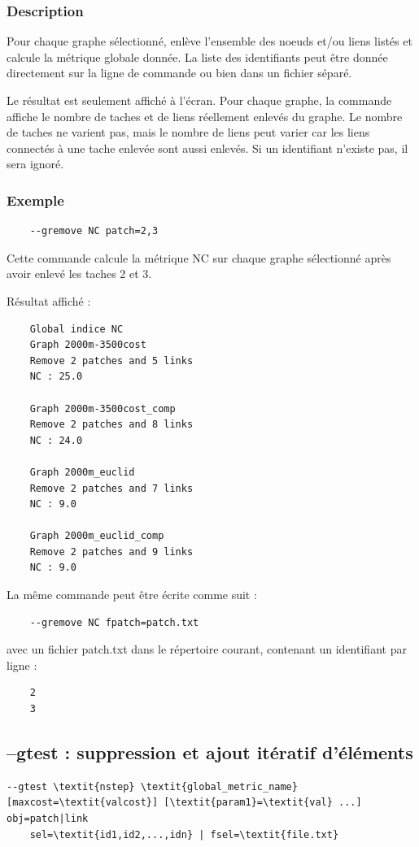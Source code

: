 \documentclass[a4paper,10pt]{report}
\begin{document}
\subsubsection{Description}
Pour chaque graphe sélectionné, enlève l'ensemble des noeuds et/ou liens listés et calcule la métrique globale donnée.
La liste des identifiants peut être donnée directement sur la ligne de commande ou bien dans un fichier séparé.

Le résultat est seulement affiché à l'écran.
Pour chaque graphe, la commande affiche le nombre de taches et de liens réellement enlevés du graphe.
Le nombre de taches ne varient pas, mais le nombre de liens peut varier car les liens connectés à une tache enlevée sont aussi enlevés.
Si un identifiant n'existe pas, il sera ignoré.

\subsubsection{Exemple}

\begin{Verbatim}
	--gremove NC patch=2,3
\end{Verbatim}

Cette commande calcule la métrique NC sur chaque graphe sélectionné après avoir enlevé les taches 2 et 3.

Résultat affiché : 
\begin{Verbatim}
	Global indice NC
	Graph 2000m-3500cost
	Remove 2 patches and 5 links
	NC : 25.0
	
	Graph 2000m-3500cost_comp
	Remove 2 patches and 8 links
	NC : 24.0
	
	Graph 2000m_euclid
	Remove 2 patches and 7 links
	NC : 9.0
	
	Graph 2000m_euclid_comp
	Remove 2 patches and 9 links
	NC : 9.0
\end{Verbatim}


La même commande peut être écrite comme suit :
\begin{Verbatim}
	--gremove NC fpatch=patch.txt
\end{Verbatim}
avec un fichier patch.txt dans le répertoire courant, contenant un identifiant par ligne :
\begin{Verbatim}
	2
	3
\end{Verbatim}


\subsection{--gtest : suppression et ajout itératif d'éléments}
\begin{Verbatim}[commandchars=\\\{\}]
--gtest \textit{nstep} \textit{global_metric_name} [maxcost=\textit{valcost}] [\textit{param1}=\textit{val} ...] obj=patch|link
	sel=\textit{id1,id2,...,idn} | fsel=\textit{file.txt}
\end{Verbatim}
\end{document}
